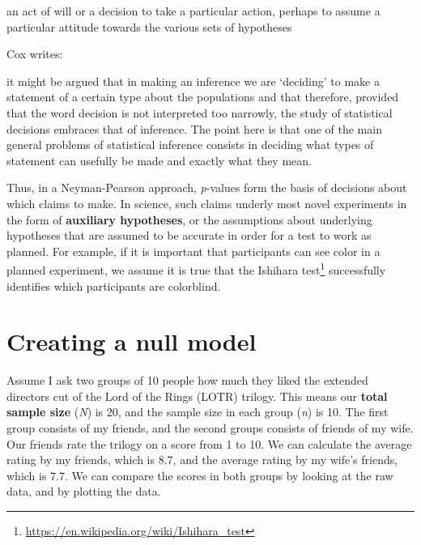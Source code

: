 \documentclass[
  oneside]{krantz}
\renewenvironment{quote}{\begin{VF}}{\end{VF}}
\renewcommand{\href}[2]{#2\footnote{\url{#1}}}
\begin{document}
\begin{quote}
an act of will or a decision to take a particular action, perhaps to assume a particular attitude towards the various sets of hypotheses
\end{quote}

Cox \citeyearpar{cox_problems_1958} writes:

\begin{quote}
it might be argued that in making an inference we are `deciding' to make a statement of a certain type about the populations and that therefore, provided that the word decision is not interpreted too narrowly, the study of statistical decisions embraces that of inference. The point here is that one of the main general problems of statistical inference consists in deciding what types of statement can usefully be made and exactly what they mean.
\end{quote}

Thus, in a Neyman-Pearson approach, \emph{p}-values form the basis of decisions about which claims to make. In science, such claims underly most novel experiments in the form of \textbf{auxiliary hypotheses}, or the assumptions about underlying hypotheses that are assumed to be accurate in order for a test to work as planned. For example, if it is important that participants can see color in a planned experiment, we assume it is true that the \href{https://en.wikipedia.org/wiki/Ishihara_test}{Ishihara test} successfully identifies which participants are colorblind.

\hypertarget{creating-a-null-model}{%
\section{Creating a null model}\label{creating-a-null-model}}

Assume I ask two groups of 10 people how much they liked the extended directors cut of the Lord of the Rings (LOTR) trilogy. This means our \textbf{total sample size} (\emph{N}) is 20, and the sample size in each group (\emph{n}) is 10. The first group consists of my friends, and the second groups consists of friends of my wife. Our friends rate the trilogy on a score from 1 to 10. We can calculate the average rating by my friends, which is 8.7, and the average rating by my wife's friends, which is 7.7. We can compare the scores in both groups by looking at the raw data, and by plotting the data.
\end{document}
